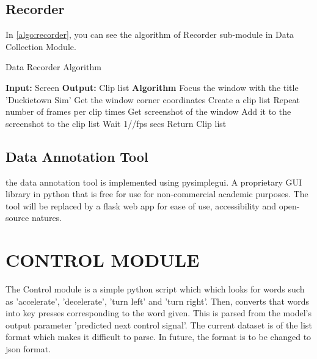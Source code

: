 \begin{spacing}{1.5}
\begin{sloppypar}
\subsection{Recorder}
In \ref{algo:recorder}, you can see the algorithm of Recorder sub-module in Data Collection Module.
\begin{algorithm}
\caption{Data Recorder Algorithm}
\begin{algorithmic}
\State \textbf{Input:} Screen
\State \textbf{Output:} Clip list
\State \textbf{Algorithm}
\State \indent Focus the window with the title 'Duckietown Sim'
\State \indent Get the window corner coordinates
\State \indent Create a clip list
\State \indent Repeat number of frames per clip times
\State \indent \indent Get screenshot of the window 
\State \indent \indent Add it to the screenshot to the clip list
\State \indent \indent Wait 1//fps secs
\State \indent Return Clip list

\end{algorithmic}
\label{algo:recorder}
\end{algorithm}
\subsection{Data Annotation Tool}  
the data annotation tool is implemented using pysimplegui. A proprietary GUI library in python that is free for use for non-commercial academic purposes. The tool will be replaced by a flask web app for ease of use, accessibility and open-source natures.
\section{CONTROL MODULE}
The Control module is a simple python script which which looks for words such as 'accelerate', 'decelerate', 'turn left' and 'turn right'. Then, converts that words into key presses corresponding to the word given. This is parsed from the model's output parameter 'predicted next control signal'. The current dataset is of the list format which makes it difficult to parse. In future, the format is to be changed to json format.

\end{sloppypar}
 \end{spacing}


